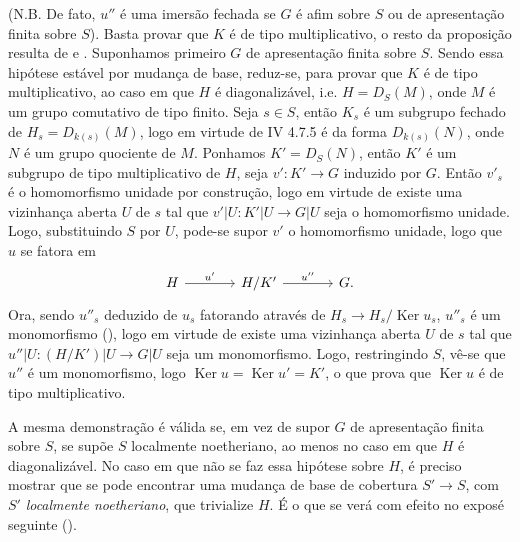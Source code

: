 (N.B. De fato, \(u''\) é uma imersão fechada se \(G\)
é afim sobre \(S\) ou de apresentação finita sobre \(S\)).
Basta provar que \(K\) é de tipo multiplicativo, o resto
da proposição resulta de
 e
.
Suponhamos primeiro \(G\) de apresentação finita sobre
\(S\). Sendo essa hipótese estável por mudança de base,
reduz-se, para provar que \(K\) é de tipo multiplicativo,
ao caso em que \(H\) é diagonalizável, i.e. \(H=D_S(M)\),
onde \(M\) é um grupo comutativo de tipo finito. Seja
\(s\in S\), então \(K_s\) é um subgrupo fechado de
\(H_s=D_{k(s)}(M)\), logo em virtude de IV 4.7.5 é da
forma \(D_{k(s)}(N)\), onde \(N\) é um grupo quociente
de \(M\). Ponhamos \(K'=D_S(N)\), então \(K'\) é um
subgrupo de tipo multiplicativo de \(H\), seja
\(v':K'\to G\) induzido por \(G\).
Então \(v'_s\) é o homomorfismo unidade por construção,
logo em virtude de 
existe uma vizinhança aberta \(U\) de \(s\) tal que
\(v'|U:K'|U\to G|U\) seja o homomorfismo unidade.
Logo, substituindo \(S\) por \(U\), pode-se supor \(v'\)
o homomorfismo unidade, logo que \(u\) se fatora em
\[
\begin{tikzcd}[column sep=large]
  H \arrow[r,"u'"] & H/K' \arrow[r,"u''"] & G.
\end{tikzcd}
\]
Ora, sendo \(u''_s\) deduzido de \(u_s\) fatorando através
de \(H_s\to H_s/\operatorname{Ker}u_s\), \(u''_s\) é um
monomorfismo (),
logo em virtude de 
existe uma vizinhança aberta \(U\) de \(s\) tal que
\(u''|U:(H/K')|U\to G|U\) seja um monomorfismo.
Logo, restringindo \(S\), vê-se que \(u''\) é um
monomorfismo, logo
\(\operatorname{Ker}u=\operatorname{Ker}u'=K'\), o que
prova que \(\operatorname{Ker}u\) é de tipo multiplicativo.

A mesma demonstração é válida se, em vez de supor \(G\)
de apresentação finita sobre \(S\), se supõe \(S\)
localmente noetheriano, ao menos no caso em que \(H\) é
diagonalizável. No caso em que não se faz essa hipótese
sobre \(H\), é preciso mostrar que se pode encontrar uma
mudança de base de cobertura \(S'\to S\), com \(S'\)
\emph{localmente noetheriano}, que trivialize \(H\).
É o que se verá com efeito no exposé seguinte
().
